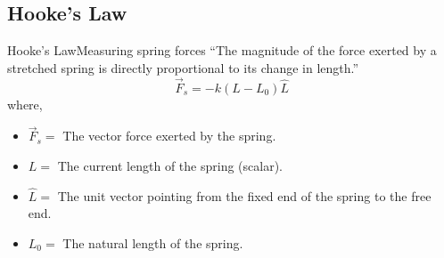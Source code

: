 





\subsection{Hooke's Law}
\begin{frame}{Hooke's Law}{Measuring spring forces}
	``The magnitude of the force exerted by a stretched spring is directly proportional to its change in length.''
	\begin{equation}
	\vec{F}_{s} = - k \left(L - L_0\right) \hat{L}
	\end{equation}
	where,
	\begin{itemize}
	\item \(\vec{F}_s = \) The vector force exerted by the spring.
    \item \(L = \) The current length of the spring (scalar).
    \item \(\hat{L} = \) The unit vector pointing from the fixed end of the spring to the free end.
    \item \(L_0 = \) The natural length of the spring.
	\end{itemize}
\end{frame}